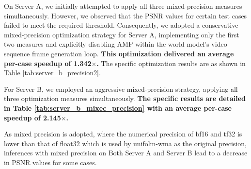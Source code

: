 On Server A, we initially attempted to apply all three mixed-precision measures simultaneously. 
However, we observed that the PSNR values for certain test cases failed to meet the required threshold. 
Consequently, we adopted a conservative mixed-precision optimization strategy for Server A, implementing only the first two measures and explicitly disabling AMP within the world model's video sequence frame generation loop. 
\textbf{This optimization delivered an average per-case speedup of 1.342$\times$.} 
The specific optimization results are as shown in Table \ref{tab:server_b_precision2}.%

For Server B, we employed an aggressive mixed-precision strategy, applying all three optimization measures simultaneously. 
\textbf{The specific results are detailed  in Table \ref{tab:server_b_mixec_precision} with  an average per-case speedup of 2.145$\times$.}

As mixed precision is adopted, where the numerical precision of bf16 and tf32 is lower than that of float32 which is used by unifolm-wma as the original precision, inferences with mixed precision on Both Server A and Server B lead to a decrease in PSNR values for some cases.



